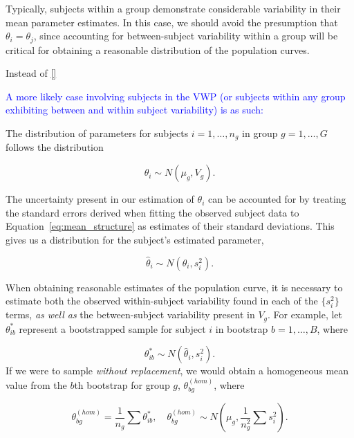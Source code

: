 \documentclass{article}
\providecommand{\cn}[1]{\textcolor{blue}{#1}}
\begin{document}
Typically, subjects within a group demonstrate considerable variability in their mean parameter estimates. In this case, we should avoid the presumption that $\theta_i = \theta_j$, since accounting for between-subject variability within a group will be critical for obtaining a reasonable distribution of the population curves.

Instead of \eqref{}

\label{eq:mean_structure}
\cn{A more likely case involving subjects in the VWP (or subjects within any group exhibiting between and within subject variability) is as such: }

The distribution of parameters for subjects $i = 1, \dots, n_g$ in group $g = 1, \dots, G$ follows the distribution

\begin{equation}\label{eq:theta_i_dist}
\theta_i \sim N(\mu_{g}, V_{g}).
\end{equation}

The uncertainty present in our estimation of $\theta_i$ can be accounted for by treating the standard errors derived when fitting the observed subject data to Equation~\ref{eq:mean_structure} as estimates of their standard deviations. This gives us a distribution for the subject's estimated parameter, 

\begin{equation}
\hat{\theta}_i \sim N(\theta_i, s_i^2).
\end{equation}

When obtaining reasonable estimates of the population curve, it is necessary to estimate both the observed within-subject variability found in each of the $\{s_i^2\}$ terms, \textit{as well as} the between-subject variability present in $V_{g}$. For example, let $\theta^*_{ib}$ represent a bootstrapped sample for subject $i$ in bootstrap $b = 1, \dots, B$, where

\begin{equation}\label{eq:sub_boot_dist}
\theta^*_{ib} \sim N(\hat{\theta}_i, s_i^2).
\end{equation}
If we were to sample \textit{without replacement}, we would obtain a homogeneous mean value from the $b$th bootstrap for group $g$, $\theta^{(hom)}_{bg}$, where

\begin{equation}\label{eq:wo_rep_boot}
\theta^{(hom)}_{bg} = \frac{1}{n_g} \sum \theta^{*}_{ib}, \quad \theta^{(hom)}_{bg} \sim N \left( \mu_{g}, \frac{1}{n_g^2} \sum s_i^2 \right).
\end{equation}
\end{document}
